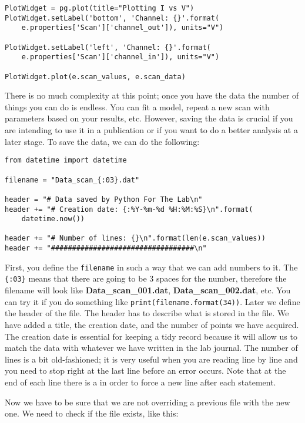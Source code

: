 \begin{verbatim}
PlotWidget = pg.plot(title="Plotting I vs V")
PlotWidget.setLabel('bottom', 'Channel: {}'.format(
    e.properties['Scan']['channel_out']), units="V")
    
PlotWidget.setLabel('left', 'Channel: {}'.format(
    e.properties['Scan']['channel_in']), units="V")
    
PlotWidget.plot(e.scan_values, e.scan_data)
\end{verbatim}

There is no much complexity at this point; once you have the data the number of things you can do is endless. You can fit a model, repeat a new scan with parameters based on your results, etc. However, saving the data is crucial if you are intending to use it in a publication or if you want to do a better analysis at a later stage. To save the data, we can do the following:

\begin{verbatim}
from datetime import datetime

filename = "Data_scan_{:03}.dat"

header = "# Data saved by Python For The Lab\n"
header += "# Creation date: {:%Y-%m-%d %H:%M:%S}\n".format(
    datetime.now())

header += "# Number of lines: {}\n".format(len(e.scan_values))
header += "##################################\n"
\end{verbatim}

First, you define the \texttt{filename} in such a way that we can add numbers to it. The \texttt{\{:03\}} means that there are going to be 3 spaces for the number, therefore the filename will look like \textbf{Data\_scan\_001.dat}, \textbf{Data\_scan\_002.dat}, etc. You can try it if you do something like \texttt{print(filename.format(34))}. Later we define the header of the file. The header has to describe what is stored in the file. We have added a title, the creation date, and the number of points we have acquired. The creation date is essential for keeping a tidy record because it will allow us to match the data with whatever we have written in the lab journal. The number of lines is a bit old-fashioned; it is very useful when you are reading line by line and you need to stop right at the last line before an error occurs. Note that at the end of each line there is a \texttt{\n} in order to force a new line after each statement.

Now we have to be sure that we are not overriding a previous file with the new one. We need to check if the file exists, like this:

